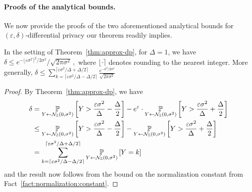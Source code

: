 \documentclass{jpcfinal} %
\newcommand{\dgausss}[2]{{\discN\left(#1,#2\right)}}
\newcommand{\dgauss}[1]{\dgausss{0}{#1}}
\newcommand{\pr}[2]{{\ifx&#1& \mathbb{P} \else
\underset{#1}{\mathbb{P}} \fi \left[#2\right]}}
\newcommand{\eps}{\varepsilon}
\begin{document}
\paragraph{Proofs of the analytical bounds.}
We now provide the proofs of the two aforementioned analytical bounds for $(\eps,\delta)$-differential privacy our theorem readily implies.
\begin{lem}
In the setting of Theorem~\ref{thm:approx-dp}, for $\Delta=1$, we have 
$
    \delta \le e^{-\lfloor \eps \sigma^2 \rceil^2/2\sigma^2}/\sqrt{2\pi\sigma^2}\,,
$
where $\lfloor\cdot\rceil$ denotes rounding to the nearest integer. More generally, $\delta \le \sum_{k=\lceil \eps\sigma^2/\Delta-\Delta/2\rceil}^{\lceil \eps\sigma^2/\Delta+\Delta/2\rceil} \frac{e^{-k^2/2\sigma^2}}{\sqrt{2\pi \sigma^2}}$
\end{lem}
\begin{proof}
By Theorem~\ref{thm:approx-dp}, we have
\begin{align*}
\delta 
&= \pr{Y \gets \dgauss{\sigma^2}}{Y > \frac{\eps \sigma^2}{\Delta}- \frac{\Delta}{2}} - e^\eps \cdot \pr{Y \gets \dgauss{\sigma^2}}{Y > \frac{\eps \sigma^2}{\Delta} + \frac{\Delta}{2}}\\
&\leq \pr{Y \gets \dgauss{\sigma^2}}{Y > \frac{\eps \sigma^2}{\Delta}- \frac{\Delta}{2}} - \pr{Y \gets \dgauss{\sigma^2}}{Y > \frac{\eps \sigma^2}{\Delta} + \frac{\Delta}{2}}\\
&= \sum_{k=\lceil \eps\sigma^2/\Delta-\Delta/2\rceil}^{\lceil \eps\sigma^2/\Delta+\Delta/2\rceil} \pr{Y \gets \dgauss{\sigma^2}}{Y = k}
\end{align*}
and the result now follows from the bound on the normalization constant from Fact~\ref{fact:normalization:constant}.
\end{proof}
\end{document}

